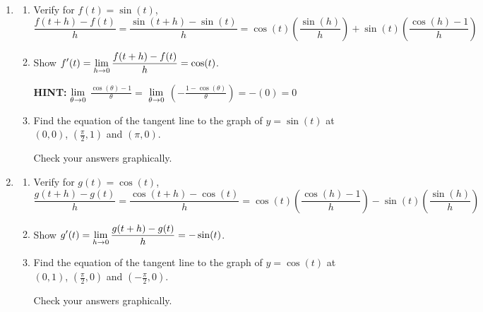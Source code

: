\documentclass{ximera}
\begin{document}
\begin{enumerate}
\setcounter{enumi}{\value{HW}}

\item\label{derivativesine}  \begin{enumerate}  \item  Verify for $f(t) = \sin(t)$, $\dfrac{f(t+h) - f(t)}{h} = \dfrac{\sin(t + h) - \sin(t)}{h} = \cos(t) \left(\dfrac{\sin(h)}{h} \right) + \sin(t) \left( \dfrac{\cos(h) - 1}{h} \right)$

\smallskip

\item  Show $\ds{f'(t) = \lim_{h \rightarrow 0} \dfrac{f(t+h) - f(t)}{h} = \cos(t)}$.

\smallskip

\textbf{HINT:}   $\ds{\lim_{\theta \rightarrow 0}}$ $\frac{\cos(\theta) - 1}{\theta} =$ $\ds{\lim_{\theta \rightarrow 0}}$ $\left(-\frac{1 - \cos(\theta)}{\theta}\right) = - (0) = 0$

\item  Find the equation of the tangent line to the graph of $y = \sin(t)$ at $(0,0)$, $\left(\frac{\pi}{2}, 1\right)$ and $(\pi, 0)$.  

\smallskip

Check your answers graphically.

\end{enumerate}

\item\label{derivativecosine} \begin{enumerate} \item   Verify for $g(t) = \cos(t)$, $\dfrac{g(t+h) - g(t)}{h} = \dfrac{\cos(t + h) - \cos(t)}{h} = \cos(t) \left( \dfrac{\cos(h) - 1}{h} \right) - \sin(t) \left(\dfrac{\sin(h)}{h} \right)$

\smallskip

\item  Show $\ds{g'(t) = \lim_{h \rightarrow 0} \dfrac{g(t+h) - g(t)}{h} =  - \sin(t)}$.

\smallskip

\item  Find the equation of the tangent line to the graph of $y = \cos(t)$ at $(0,1)$, $\left(\frac{\pi}{2}, 0\right)$ and $\left(-\frac{\pi}{2}, 0\right)$.  

\smallskip

Check your answers graphically.

\end{enumerate}

\setcounter{HW}{\value{enumi}}
\end{enumerate}
\end{document}

